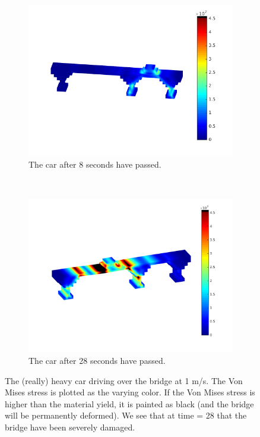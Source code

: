 \begin{figure}[ht]
        \centering
        \begin{subfigure}[b]{0.45 \textwidth}
                \includegraphics[width=\textwidth]{time080}
                \caption{The car after 8 seconds have passed.}
        \end{subfigure}
        ~
        \begin{subfigure}[b]{0.45 \textwidth}
                \includegraphics[width=\textwidth]{time230}
                \caption{The car after 28 seconds have passed.}
        \end{subfigure}
        \caption{The (really) heavy car driving over the bridge at 1 m/s. The Von Mises stress is plotted as the varying color. If the Von Mises stress is higher than the material yield, it is painted as black (and the bridge will be permanently deformed). We see that at time = 28 that the bridge have been severely damaged. }
        \label{fig:bridget8t23}
\end{figure}

